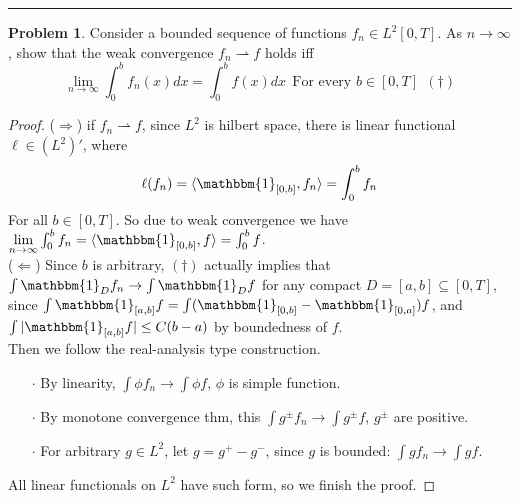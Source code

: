 \documentclass[a4paper, 10pt]{article}
\theoremstyle{definition}
\newtheorem{problem}{Problem}
\theoremstyle{hSol}
\begin{document}
\noindent\rule{16cm}{0.4pt}
\begin{problem} Consider a bounded sequence of functions $f_n \in L^2[0,T]$. As $n\to \infty$, show that the weak convergence $f_n \rightharpoonup f$ holds iff
$$
\lim\limits_{n\rightarrow\infty}\int_0^b f_n(x)dx = \int_0^b f(x) dx~~\text{For every }b\in [0,T]~~(\dag)
$$
\end{problem}
\begin{proof} ($\Rightarrow$) if $f_n \rightharpoonup f$, since $L^2$ is hilbert space, there is linear functional $\ell \in (L^2)'$, where
\begin{equation}
  \ell(f_n) = \langle \mathbbm{1}_{[0,b]}, f_n \rangle = \int_0^b f_n
\end{equation}
For all $b\in[0,T]$. So due to weak convergence we have $\lim\limits_{n\rightarrow\infty}\int_0^b f_n = \langle \mathbbm{1}_{[0,b]}, f \rangle = \int_0^b f$.\\
($\Leftarrow$) Since $b$ is arbitrary, $(\dag)$ actually implies that $\int \mathbbm{1}_{D} f_n \to \int \mathbbm{1}_{D}f$ for any compact $D=[a,b]\subseteq [0,T]$, since $\int \mathbbm{1}_{[a,b]}f = \int (\mathbbm{1}_{[0,b]}-\mathbbm{1}_{[0,a]})f$, and $\int |\mathbbm{1}_{[a,b]}f|\leq C(b-a)$ by boundedness of $f$. \\
Then we follow the real-analysis type construction.
\begin{itemize}
  \item[$\cdot$] By linearity, $\int \phi f_n \to \int \phi f$, $\phi$ is simple function.
  \item[$\cdot$] By monotone convergence thm, this $\int g^{\pm} f_n \to \int g^{\pm} f$, $g^{\pm}$ are positive.
  \item[$\cdot$] For arbitrary $g\in L^2$, let $g=g^{+}-g^{-}$, since $g$ is bounded: $\int g f_n \to \int g f$.
\end{itemize}
All linear functionals on $L^2$ have such form, so we finish the proof.
\end{proof}
\end{document}
